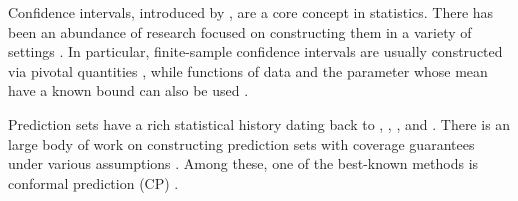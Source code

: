 \documentclass[english]{article}
\begin{document}
Confidence intervals, introduced by  \cite{neyman1937outline}, are a core concept in statistics.
There has been an abundance of research focused on constructing them in a variety of settings
\citep[e.g.,][etc]{vsidak1967rectangular,efron1986bootstrap,diciccio1996bootstrap,boldin1997sign,csaji2012non,wasserman2020universal}.
In particular, 
finite-sample confidence intervals are usually constructed via pivotal quantities \citep[e.g.,][etc]{lehmann1998theory,cox1979theoretical}, while functions of data and the parameter whose mean have a known bound can also be used \citep[e.g.,][etc]{wasserman2020universal,xu2022post}.

Prediction sets have a rich statistical history dating back to \protect\cite{wilks1941determination}, \protect\cite{Wald1943}, \protect\cite{scheffe1945non}, and \protect\cite{tukey1947non,tukey1948nonparametric}.
There is an large body of work on constructing prediction sets with coverage guarantees under various assumptions
\protect\citep[see, e.g.,][]{bates2021distribution,Chernozhukov2018,dunn2018distribution,Lei2014,lei2013distribution,lei2015conformal,Lei2018,Park2020,park2021pac,Sadinle2019,kaur2022idecode,qiu2022distribution,li2022pac,sesia2022conformal}. 
Among these, one of the best-known methods is conformal prediction (CP) \protect\citep[see, e.g.,][]{saunders1999transduction,vovk1999machine,
papadopoulos2002inductive,vovk2022algorithmic, Chernozhukov2018,dunn2018distribution,Lei2014,lei2013distribution,Lei2018}. 
\end{document}
